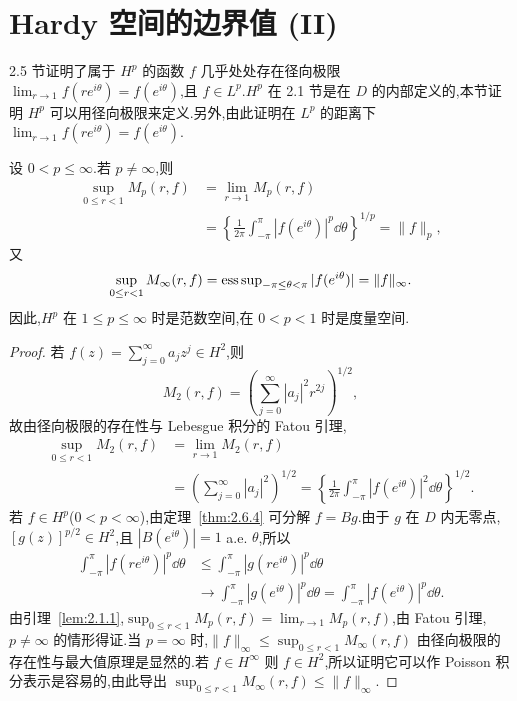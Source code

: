 \section{Hardy 空间的边界值 (II)}\label{sec:2.7}

2.5 节证明了属于 $H^{p}$ 的函数 $f$ 几乎处处存在径向极限 $\lim_{r \to 1}f(re^{i\theta}) = f(e^{i\theta})$,且 $f \in L^{p}$.$H^{p}$ 在 2.1 节是在 $D$ 的内部定义的,本节证明 $H^{p}$ 可以用径向极限来定义.另外,由此证明在 $L^{p}$ 的距离下 $\lim_{r \to 1}f(re^{i\theta}) = f(e^{i\theta})$.

\begin{theorem}\label{thm:2.7.1}
设 $0 < p \leq \infty$.若 $p \neq \infty$,则
\begin{align*}
\sup_{0 \leq r < 1}M_{p}(r, f) & = \lim_{r \to 1}M_{p}(r, f) \\
& = \left\{\frac{1}{2\pi}\int_{-\pi}^{\pi}|f(e^{i\theta})|^{p}\dd\theta\right\}^{1/p} = \|f\|_{p},
\end{align*}
又
\begin{equation*}
\sup_{0 \leq r < 1}M_{\infty}(r, f) = \operatorname{ess\,sup}_{-\pi \leq \theta < \pi}|f(e^{i\theta})| = \|f\|_{\infty}.
\end{equation*}
因此,$H^{p}$ 在 $1 \leq p \leq \infty$ 时是范数空间,在 $0 < p < 1$ 时是度量空间.
\end{theorem}

\begin{proof}
若 $f(z) = \sum_{j=0}^{\infty}a_{j}z^{j} \in H^{2}$,则
\begin{equation*}
M_{2}(r, f) = \left(\sum_{j = 0}^{\infty}|a_{j}|^{2}r^{2j}\right)^{1/2},
\end{equation*}
故由径向极限的存在性与 Lebesgue 积分的 Fatou 引理,
\begin{align*}
\sup_{0 \leq r < 1}M_{2}(r, f) & = \lim_{r \to 1}M_{2}(r, f) \\
& = \left(\sum_{j = 0}^{\infty}|a_{j}|^{2}\right)^{1/2} = \left\{\frac{1}{2\pi}\int_{-\pi}^{\pi}|f(e^{i\theta})|^{2}\dd\theta\right\}^{1/2}.
\end{align*}
若 $f \in H^{p}$($0 < p < \infty$),由定理~\ref{thm:2.6.4} 可分解 $f = Bg$.由于 $g$ 在 $D$ 内无零点,$[g(z)]^{p/2} \in H^{2}$,且 $|B(e^{i\theta})| = 1$ a.e. $\theta$,所以
\begin{align*}
\int_{-\pi}^{\pi}|f(re^{i\theta})|^{p}\dd\theta &\leq \int_{-\pi}^{\pi}|g(re^{i\theta})|^{p}\dd\theta \\
&\rightarrow \int_{-\pi}^{\pi}|g(e^{i\theta})|^{p}\dd\theta = \int_{-\pi}^{\pi}|f(e^{i\theta})|^{p}\dd\theta.
\end{align*}
由引理~\ref{lem:2.1.1},$\sup_{0 \leq r < 1}M_{p}(r, f) = \lim_{r \to 1}M_{p}(r, f)$,由 Fatou 引理,$p \neq \infty$ 的情形得证.当 $p = \infty$ 时,$\|f\|_{\infty} \leq \sup_{0 \leq r < 1}M_{\infty}(r, f)$ 由径向极限的存在性与最大值原理是显然的.若 $f \in H^{\infty}$ 则 $f \in H^{2}$,所以证明它可以作 Poisson 积分表示是容易的,由此导出 $\sup_{0 \leq r < 1}M_{\infty}(r, f) \leq \|f\|_{\infty}$.
\end{proof}

